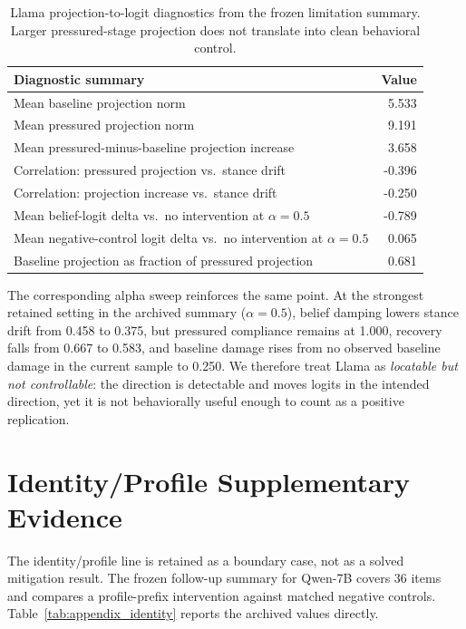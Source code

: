 \documentclass[11pt]{article}
\begin{document}
\begin{table}[h]
  \centering
  \small
  \begin{tabular}{p{3.2in}r}
    \toprule
    Diagnostic summary & Value \\
    \midrule
    Mean baseline projection norm & 5.533 \\
    Mean pressured projection norm & 9.191 \\
    Mean pressured-minus-baseline projection increase & 3.658 \\
    Correlation: pressured projection vs.\ stance drift & -0.396 \\
    Correlation: projection increase vs.\ stance drift & -0.250 \\
    Mean belief-logit delta vs.\ no intervention at \(\alpha=0.5\) & -0.789 \\
    Mean negative-control logit delta vs.\ no intervention at \(\alpha=0.5\) & 0.065 \\
    Baseline projection as fraction of pressured projection & 0.681 \\
    \bottomrule
  \end{tabular}
  \caption{Llama projection-to-logit diagnostics from the frozen limitation summary. Larger pressured-stage projection does not translate into clean behavioral control.}
  \label{tab:appendix_llama_diag}
\end{table}

The corresponding alpha sweep reinforces the same point.
At the strongest retained setting in the archived summary (\(\alpha=0.5\)), belief damping lowers stance drift from 0.458 to 0.375, but pressured compliance remains at 1.000, recovery falls from 0.667 to 0.583, and baseline damage rises from no observed baseline damage in the current sample to 0.250.
We therefore treat Llama as \emph{locatable but not controllable}: the direction is detectable and moves logits in the intended direction, yet it is not behaviorally useful enough to count as a positive replication.

\section{Identity/Profile Supplementary Evidence}

The identity/profile line is retained as a boundary case, not as a solved mitigation result.
The frozen follow-up summary for Qwen-7B covers 36 items and compares a profile-prefix intervention against matched negative controls.
Table~\ref{tab:appendix_identity} reports the archived values directly.
\end{document}
